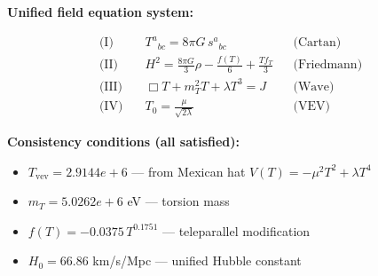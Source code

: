 
\textbf{Unified field equation system:}

\begin{align}
  \text{(I)} \quad & T^a{}_{bc} = 8\pi G \, s^a{}_{bc} && \text{(Cartan)} \\
  \text{(II)} \quad & H^2 = \frac{8\pi G}{3}\rho - \frac{f(T)}{6} + \frac{Tf_T}{3} && \text{(Friedmann)} \\
  \text{(III)} \quad & \Box T + m_T^2 T + \lambda T^3 = J && \text{(Wave)} \\
  \text{(IV)} \quad & T_0 = \frac{\mu}{\sqrt{2\lambda}} && \text{(VEV)}
\end{align}

\textbf{Consistency conditions (all satisfied):}
\begin{itemize}
  \item $T_{\text{vev}} = 2.9144e+6$ — from Mexican hat $V(T) = -\mu^2 T^2 + \lambda T^4$
  \item $m_T = 5.0262e+6$ eV — torsion mass
  \item $f(T) = -0.0375 \, T^{0.1751}$ — teleparallel modification
  \item $H_0 = 66.86$ km/s/Mpc — unified Hubble constant
\end{itemize}